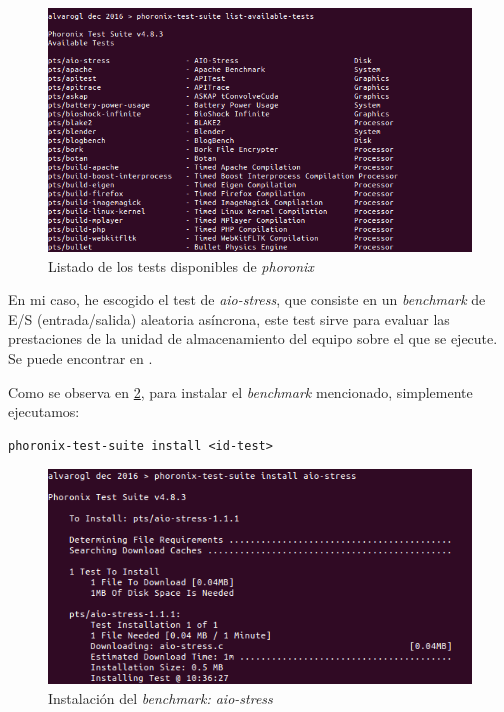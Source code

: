 \begin{figure}[H]
	\centering
	\includegraphics[scale=0.6]{cuestion1-01.png}
	\caption{Listado de los tests disponibles de \textit{phoronix}} \label{cuestion1-01}
\end{figure}

En mi caso, he escogido el test de \textit{aio-stress}, que consiste en un \textit{benchmark} de E/S (entrada/salida) aleatoria asíncrona, este test sirve para evaluar las prestaciones de la unidad de almacenamiento del equipo sobre el que se ejecute. Se puede encontrar en \cite{aio-stress}.

Como se observa en \ref{cuestion1-02}, para instalar el \textit{benchmark} mencionado, simplemente ejecutamos:

\begin{verbatim}
phoronix-test-suite install <id-test>
\end{verbatim}

\begin{figure}[H]
	\centering
	\includegraphics[scale=0.6]{cuestion1-02.png}
	\caption{Instalación del \textit{benchmark: aio-stress}} \label{cuestion1-02}
\end{figure}

